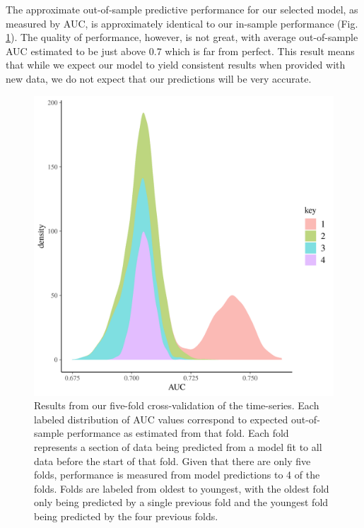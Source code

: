 \documentclass[12pt,letterpaper]{article}
\begin{document}
The approximate out-of-sample predictive performance for our selected model, as measured by AUC, is approximately identical to our in-sample performance (Fig. \ref{fig:fold_auc}). The quality of performance, however, is not great, with average out-of-sample AUC estimated to be just above 0.7 which is far from perfect. This result means that while we expect our model to yield consistent results when provided with new data, we do not expect that our predictions will be very accurate.
\begin{figure}[ht]
  \centering
  \includegraphics[width=\textwidth,height=0.5\textheight,keepaspectratio=true]{figure/fold_auc}
  \caption{Results from our five-fold cross-validation of the time-series. Each labeled distribution of AUC values correspond to expected out-of-sample performance as estimated from that fold. Each fold represents a section of data being predicted from a model fit to all data before the start of that fold. Given that there are only five folds, performance is measured from model predictions to 4 of the folds. Folds are labeled from oldest to youngest, with the oldest fold only being predicted by a single previous fold and the youngest fold being predicted by the four previous folds.}
  \label{fig:fold_auc}
\end{figure}

\end{document}
